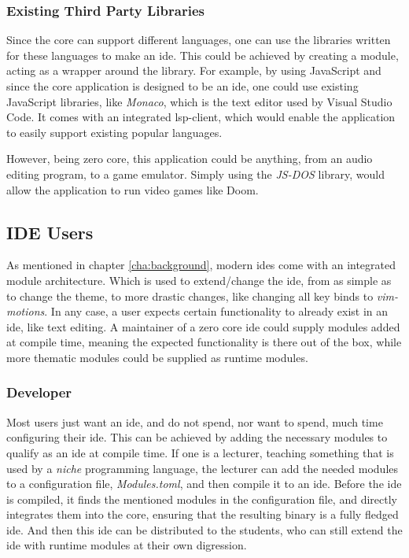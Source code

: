 \subsubsection{Existing Third Party Libraries}

Since the core can support different languages, one can use the libraries
written for these languages to make an \gls{ide}. This could be achieved by
creating a module, acting as a wrapper around the library. For example, by
using JavaScript and since the core application is designed to be an \gls{ide},
one could use existing JavaScript libraries, like \textit{Monaco}, which is the
text editor used by Visual Studio Code. It comes with an integrated
\gls{lsp}-client, which would enable the application to easily support existing
popular languages.

However, being zero core, this application could be anything, from an audio
editing program, to a game emulator. Simply using the \textit{JS-DOS} library,
would allow the application to run video games like Doom.

\subsection{IDE Users}

As mentioned in chapter \ref{cha:background}, modern \gls{ide}s come with an
integrated module architecture. Which is used to extend/change the \gls{ide},
from as simple as to change the theme, to more drastic changes, like changing
all key binds to \textit{vim-motions}. In any case, a user expects certain
functionality to already exist in an \gls{ide}, like text editing. A maintainer
of a zero core \gls{ide} could supply modules added at compile time, meaning the
expected functionality is there out of the box, while more thematic modules
could be supplied as runtime modules.


\subsubsection{Developer}

Most users just want an \gls{ide}, and do not spend, nor want to spend, much
time configuring their \gls{ide}. This can be achieved by adding the necessary
modules to qualify as an \gls{ide} at compile time. If one is a lecturer,
teaching something that is used by a \textit{niche} programming language, the
lecturer can add the needed modules to a configuration file,
\textit{Modules.toml}, and then compile it to an \gls{ide}. Before the \gls{ide}
is compiled, it finds the mentioned modules in the configuration file, and
directly integrates them into the core, ensuring that the resulting binary is a
fully fledged \gls{ide}. And then this \gls{ide} can be distributed to the
students, who can still extend the \gls{ide} with runtime modules at their own
digression.

